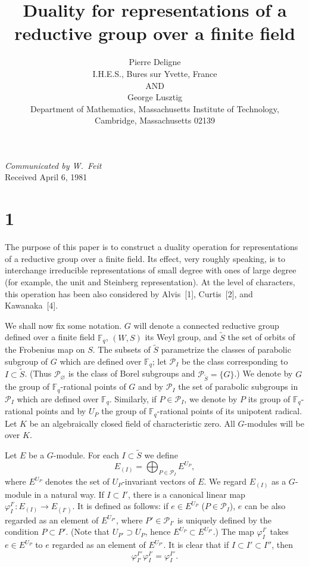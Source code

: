 \documentclass[12pt,a4paper]{article}
\title{Duality for representations of a reductive group over a finite field}
\author{Pierre Deligne \\ I.H.E.S., Bures sur Yvette, France \\ AND \\ George Lusztig \\ Department of Mathematics, Massachusetts Institute of Technology, \\ Cambridge, Massachusetts 02139}
\date{}
\theoremstyle{plain}
\theoremstyle{definition}
\theoremstyle{remark}
\newcommand{\F}{\mathbb{F}}
\newcommand{\cP}{\mathcal{P}}
\providecommand{\cP}{\mathcal{P}}
\begin{document}

\maketitle

\begin{center}
\textit{Communicated by W.~Feit}\\[4pt]
Received April 6, 1981
\end{center}

\section*{1}

The purpose of this paper is to construct a duality operation for representations of a reductive group over a finite field. Its effect, very roughly speaking, is to interchange irreducible representations of small degree with ones of large degree (for example, the unit and Steinberg representation). At the level of characters, this operation has been also considered by Alvis~[1], Curtis~[2], and Kawanaka~[4].

We shall now fix some notation. $G$ will denote a connected reductive group defined over a finite field $\F_q$, $(W,S)$ its Weyl group, and $\tilde{S}$ the set of orbits of the Frobenius map on $S$. The subsets of $\tilde{S}$ parametrize the classes of parabolic subgroup of $G$ which are defined over $\F_q$; let $\cP_I$ be the class corresponding to $I \subset \tilde{S}$. (Thus $\cP_\varnothing$ is the class of Borel subgroups and $\cP_{\tilde{S}} = \{G\}$.) We denote by $G$ the group of $\F_q$-rational points of $G$ and by $\cP_I$ the set of parabolic subgroups in $\cP_I$ which are defined over $\F_q$. Similarly, if $P \in \cP_I$, we denote by $P$ its group of $\F_q$-rational points and by $U_P$ the group of $\F_q$-rational points of its unipotent radical. Let $K$ be an algebraically closed field of characteristic zero. All $G$-modules will be over $K$.

Let $E$ be a $G$-module. For each $I \subset \tilde{S}$ we define
\begin{equation*}
E_{(I)} = \bigoplus_{P \in \cP_I} E^{U_P},
\end{equation*}
where $E^{U_P}$ denotes the set of $U_P$-invariant vectors of $E$. We regard $E_{(I)}$ as a $G$-module in a natural way. If $I \subset I'$, there is a canonical linear map $\varphi_I^{I'} \colon E_{(I)} \to E_{(I')}$. It is defined as follows: if $e \in E^{U_P}$ ($P \in \cP_I$), $e$ can be also regarded as an element of $E^{U_{P'}}$, where $P' \in \cP_{I'}$ is uniquely defined by the condition $P \subset P'$. (Note that $U_{P'} \supset U_P$, hence $E^{U_P} \subset E^{U_{P'}}$.)
The map $\varphi_I^{I'}$ takes $e \in E^{U_P}$ to $e$ regarded as an element of $E^{U_{P'}}$. It is clear that if $I \subset I' \subset I''$, then
\begin{equation}\label{eq:1.1}
\varphi_{I'}^{I''} \varphi_I^{I'} = \varphi_I^{I''}.
\end{equation}
\end{document}

